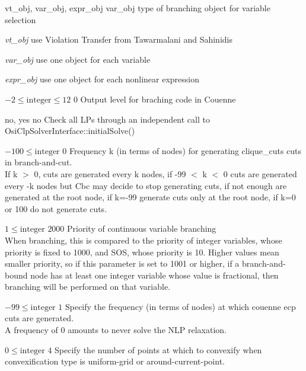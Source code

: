 %
{vt\_obj, var\_obj, expr\_obj}%
{var\_obj}%
{type of branching object for variable selection}%
{\begin{list}{}{
\setlength{\parsep}{0em}
\setlength{\leftmargin}{3ex}
\setlength{\labelwidth}{1ex}
\setlength{\itemindent}{0ex}
\setlength{\topsep}{0pt}}
\item[\textit{vt\_obj}] use Violation Transfer from Tawarmalani and Sahinidis
\item[\textit{var\_obj}] use one object for each variable
\item[\textit{expr\_obj}] use one object for each nonlinear expression
\end{list}
}

%
{$-2\leq\textrm{integer}\leq12$}%
{$0$}%
{Output level for braching code in Couenne}%
{}

%
{no, yes}%
{no}%
{Check all LPs through an independent call to OsiClpSolverInterface::initialSolve()}%
{}

%
{$-100\leq\textrm{integer}$}%
{$0$}%
{Frequency k (in terms of nodes) for generating clique\_cuts cuts in branch-and-cut.\\
If k $>$ 0, cuts are generated every k nodes, if -99 $<$ k $<$ 0 cuts are generated every -k nodes but Cbc may decide to stop generating cuts, if not enough are generated at the root node, if k=-99 generate cuts only at the root node, if k=0 or 100 do not generate cuts.}%
{}

%
{$1\leq\textrm{integer}$}%
{$2000$}%
{Priority of continuous variable branching\\
When branching, this is compared to the priority of integer variables, whose priority is fixed to 1000, and SOS, whose priority is 10. Higher values mean smaller priority, so if this parameter is set to 1001 or higher, if a branch-and-bound node has at least one integer variable whose value is fractional, then branching will be performed on that variable.}%
{}

%
{$-99\leq\textrm{integer}$}%
{$1$}%
{Specify the frequency (in terms of nodes) at which couenne ecp cuts are generated.\\
A frequency of 0 amounts to never solve the NLP relaxation.}%
{}

%
{$0\leq\textrm{integer}$}%
{$4$}%
{Specify the number of points at which to convexify when convexification type is uniform-grid or around-current-point.}%
{}

